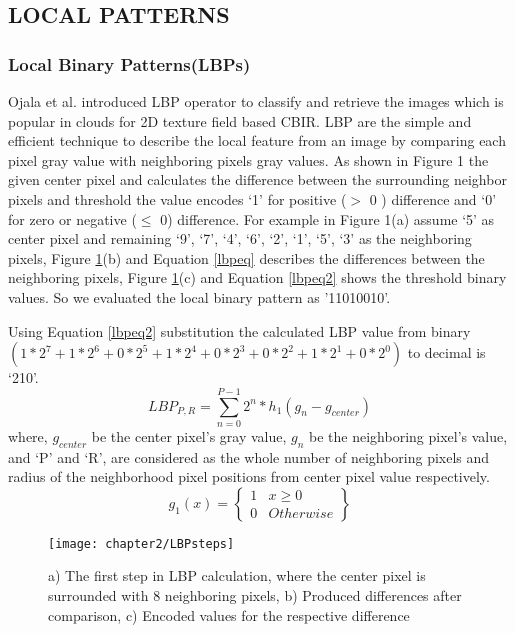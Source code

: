 \subsection{LOCAL PATTERNS}
\subsubsection{Local Binary Patterns(LBPs)}
Ojala et al. \cite{ojala2002multiresolution} introduced LBP operator to classify and retrieve the images which is popular in clouds for 2D texture field based CBIR. LBP are the simple and efficient technique to describe the local feature from an image by comparing each pixel gray value with neighboring pixels gray values. As shown in Figure 1 the given center pixel and calculates the difference between the surrounding neighbor pixels and threshold the value
encodes ‘1’ for positive ($>$ 0 ) difference and ‘0’ for zero or negative ($\le$ 0) difference. For example in Figure 1(a) assume ‘5’ as center pixel and remaining ‘9’, ‘7’, ‘4’, ‘6’, ‘2’, ‘1’, ‘5’, ‘3’ as the
neighboring pixels, Figure \ref{fig:lbpsteps}(b) and Equation \ref{lbpeq} describes the differences between the neighboring pixels, Figure \ref{fig:lbpsteps}(c) and Equation \ref{lbpeq2} shows the threshold binary values. So we evaluated the local binary pattern as '11010010'.

Using Equation \ref{lbpeq2} substitution the calculated LBP value from binary $(1 * 2^7 + 1 * 2^6 + 0 * 2^5 + 1 * 2^4 + 0 * 2^3 + 0 * 2^2 + 1 * 2^1 + 0 * 2^0 )$ to decimal is `210'.
\begin{equation}
LBP_{P,R}=\sum_{n=0}^{P-1} 2^n * h_1(g_n-g_{center})
\label{lbpeq}
\end{equation}
where, $g_{center}$ be the center pixel's gray value, $g_n$ be the neighboring pixel's value, and `P' and `R', are considered as the whole number of neighboring pixels and radius of the neighborhood pixel positions from center pixel value respectively.
\begin{equation}
g_1(x)=\left\{\begin{array}{cl} 1 &  x \ge 0 \\ 0 & Otherwise \end{array}\right\}
\label{lbpeq2}
\end{equation}


\begin{figure}[!ht]
	\centering
	\texttt{[image: chapter2/LBPsteps]}
	\caption{a) The first step in LBP calculation, where the center pixel is surrounded with 8 neighboring pixels, b) Produced differences after comparison, c) Encoded values for the respective difference}
	\label{fig:lbpsteps}
\end{figure}


